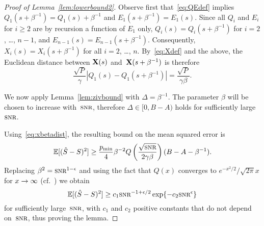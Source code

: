 \begin{proof}[Proof of Lemma~\ref{lem:lowerbound2}]
  Observe first that~\eqref{eq:QEdef} implies $Q_1(s + \beta^{-1}) = Q_1(s) +
  \beta^{-1}$ and $E_1(s + \beta^{-1}) = E_1(s)$. Since all $Q_i$ and $E_i$ for
  $i \ge 2$ are by recursion a function of $E_1$ only, $Q_i(s) = Q_i(s +
  \beta^{-1})$ for $i = 2$, \dots, $n-1$, and $E_{n-1}(s) = E_{n-1}(s +
  \beta^{-1})$. Consequently,  $X_i(s) = X_i(s + \beta^{-1})$ for all $i =
  2$, \dots, $n$. By~\eqref{eq:Xdef} and the above, the Euclidean distance
  between $\mathbf{X}(s)$ and~$\mathbf{X}(s+\beta^{-1})$ is therefore
  \begin{equation}
    \label{eq:xbetadist}
    \frac{\sqrt P}{\gamma} |Q_1(s) - Q_1(s+\beta^{-1})| 
    = \frac{\sqrt P}{\gamma\beta}.
  \end{equation}

  We now apply Lemma~\ref{lem:zivbound} with $\Delta = \beta^{-1}$. The
  parameter $\beta$ will be chosen to increase with~$\snr$, therefore $\Delta
  \in [0, B-A)$ holds for sufficiently large~$\snr$.

  Using~\eqref{eq:xbetadist}, the resulting bound on the mean squared error is
  \begin{equation*}
    \mse \ge \frac{\pmin}{4} \beta^{-2}
    Q\left (\frac{\sqrt{\snr}}{2\gamma\beta}  \right) (B-A-\beta^{-1}
    ).
  \end{equation*}
  Replacing $\beta^2 = \snr^{1-\e}$ and using the fact that $Q(x)$ converges to
  $e^{-x^2/2}/\sqrt{2\pi}x$ for $x \rightarrow \infty$
  (cf.~\cite{AbramowitzS1964}) we obtain
  \begin{equation*}
    \mse \ge c_1 \snr^{-1 + \e/2} \exp\{-c_2\snr^\e\}
  \end{equation*}
  for sufficiently large~$\snr$, with $c_1$ and $c_2$ positive constants that do
  not depend on~$\snr$, thus proving the lemma.
\end{proof}


